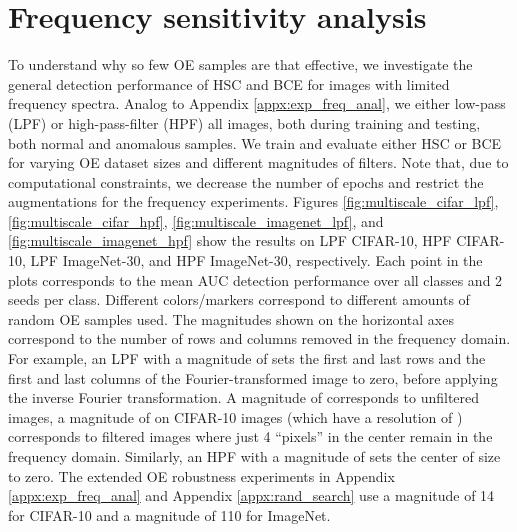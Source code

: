 \documentclass[10pt]{article} \usepackage[accepted]{stylefiles/tmlr}
\begin{document}
\section{Frequency sensitivity analysis} \label{appx:freq_sens_anal}
To understand why so few OE samples are that effective, we investigate the general detection performance of HSC and BCE for images with limited frequency spectra.
Analog to Appendix \ref{appx:exp_freq_anal}, we either low-pass (LPF) or high-pass-filter (HPF) all images, both during training and testing, both normal and anomalous samples. 
We train and evaluate either HSC or BCE for varying OE dataset sizes and different magnitudes of filters.
Note that, due to computational constraints, we decrease the number of epochs and restrict the augmentations for the frequency experiments. 
Figures \ref{fig:multiscale_cifar_lpf}, \ref{fig:multiscale_cifar_hpf}, \ref{fig:multiscale_imagenet_lpf}, and \ref{fig:multiscale_imagenet_hpf} show the results on LPF CIFAR-10, HPF CIFAR-10, LPF ImageNet-30, and HPF ImageNet-30, respectively.
Each point in the plots corresponds to the mean AUC detection performance over all classes and 2 seeds per class.
Different colors/markers correspond to different amounts of random OE samples used.
The magnitudes shown on the horizontal axes correspond to the number of rows and columns removed in the frequency domain. 
For example, an LPF with a magnitude of  sets the first and last  rows and the first and last  columns of the Fourier-transformed image to zero, before applying the inverse Fourier transformation. 
A magnitude of  corresponds to unfiltered images, a magnitude of  on CIFAR-10 images (which have a resolution of ) corresponds to filtered images where just 4 ``pixels'' in the center remain in the frequency domain. 
Similarly, an HPF with a magnitude of  sets the center of size  to zero. 
The extended OE robustness experiments in Appendix \ref{appx:exp_freq_anal} and Appendix \ref{appx:rand_search} use a magnitude of 14 for CIFAR-10 and a magnitude of 110 for ImageNet.
\end{document}

